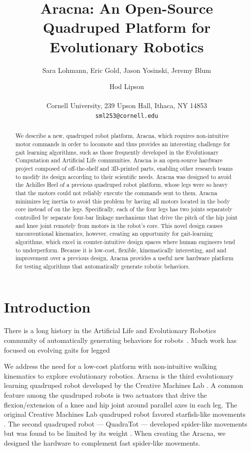 \documentclass[letterpaper]{article}
\title{Aracna: An Open-Source Quadruped Platform for Evolutionary Robotics}
\author{Sara Lohmann, Eric Gold, Jason Yosinski, Jeremy Blum \and Hod Lipson \\
\mbox{}\\
Cornell University, 239 Upson Hall, Ithaca, NY 14853 \\
\texttt{sml253@cornell.edu}}
\begin{document}
\maketitle

\begin{abstract}
We describe a new, quadruped robot platform, Aracna,
which requires non-intuitive motor commands in order to locomote and thus provides an interesting challenge for gait learning algorithms, such as those frequently developed in the Evolutionary Computation and Artificial Life communities. Aracna is an open-source hardware project composed of off-the-shelf and 3D-printed parts, enabling other research teams to modify its design according to their scientific needs. Aracna was designed to avoid the Achilles Heel of a previous quadruped robot platform, whose legs were so heavy that the motors could not reliably execute the commands sent to them. Aracna minimizes leg inertia to avoid this problem by having all motors located in the body core instead of on the legs.  Specifically, each of the four legs has two joints separately controlled by separate four-bar linkage
mechanisms that drive the pitch of the hip joint and knee joint remotely from motors in the robot's core. 
This novel design causes unconventional kinematics, however, creating an opportunity for gait-learning algorithms, which excel in counter-intuitive design spaces where human engineers tend to underperform.  Because it is low-cost, flexible, kinematically interesting, and and improvement over a previous design, Aracna provides a useful new hardware platform for testing algorithms that automatically generate robotic behaviors. 
\end{abstract}



\section{Introduction}

There is a long history in the Artificial Life and Evolutionary Robotics community of automatically generating behaviors for robots~\citep{nolfi2000evolutionary, pfeifer2007body, sims1994evolving, hornby2005autonomous, lipson2000automatic}. Much work has focused on evolving gaits for legged  


We address the need for a low-cost platform with non-intuitive walking
kinematics to explore evolutionary robotics. Aracna is the third
evolutionary learning quadruped robot developed by the Creative
Machines Lab \citep{HL, JY}. A common feature among the quadruped
robots is two actuators that drive the flexion/extension of a knee and
hip joint around parallel axes in each leg. The original Creative
Machines Lab quadruped robot favored starfish-like movements
\citep{HL}. The second quadruped robot --- QuadraTot ---
developed spider-like movements but was found to be limited by its
weight \citep{JY}. When creating the Aracna, we designed the hardware to
complement fast spider-like movements.
\end{document}
